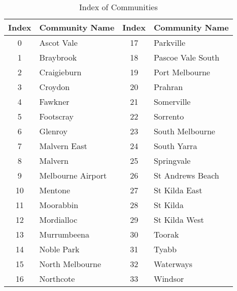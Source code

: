 \begin{table}[h!]
    \centering
    \begin{tabular}{|c|l|c|l|}
    \hline
    \textbf{Index} & \textbf{Community Name} & \textbf{Index} & \textbf{Community Name} \\ \hline
    0  & Ascot Vale          & 17 & Parkville           \\
    1  & Braybrook           & 18 & Pascoe Vale South   \\
    2  & Craigieburn         & 19 & Port Melbourne      \\
    3  & Croydon             & 20 & Prahran             \\
    4  & Fawkner             & 21 & Somerville          \\
    5  & Footscray           & 22 & Sorrento            \\
    6  & Glenroy             & 23 & South Melbourne     \\
    7  & Malvern East        & 24 & South Yarra         \\
    8  & Malvern             & 25 & Springvale          \\
    9  & Melbourne Airport   & 26 & St Andrews Beach    \\
    10 & Mentone             & 27 & St Kilda East       \\
    11 & Moorabbin           & 28 & St Kilda            \\
    12 & Mordialloc          & 29 & St Kilda West       \\
    13 & Murrumbeena         & 30 & Toorak              \\
    14 & Noble Park          & 31 & Tyabb               \\
    15 & North Melbourne     & 32 & Waterways           \\
    16 & Northcote           & 33 & Windsor             \\ \hline
    \end{tabular}
    \caption{Index of Communities}
    \label{tab:merged_community_names_serial}
    \end{table}
    